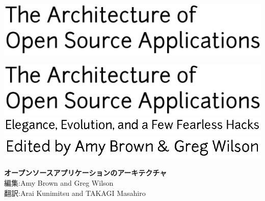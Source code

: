 \newpage

\thispagestyle{empty}
\hspace{-2cm}\includegraphics[width=400pt]{../images/frontmatter/title.eps} 

\newpage

\thispagestyle{empty}
\mbox{}    %

\newpage

\thispagestyle{empty}
\hspace{-2cm}\includegraphics[width=400pt]{../images/frontmatter/title.eps} 
\\
\vspace{0.5cm}
\hspace{2.8cm}\includegraphics{../images/frontmatter/subtitle.eps}
\\[13.5cm]
\vspace{0.5cm}
\hspace{6.5cm}\includegraphics{../images/frontmatter/eds.eps}

\newpage

\thispagestyle{empty}

\small
\noindent \textbf{オープンソースアプリケーションのアーキテクチャ} \\
編集:Amy Brown and Greg Wilson \\
翻訳:Arai Kunimitsu and TAKAGI Masahiro


